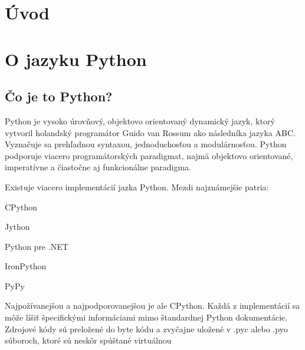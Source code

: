 \documentclass[11pt,oneside,final]{fithesis2}
\begin{document}
 \FrontMatter  
 \ThesisTitlePage

\begin{ThesisDeclaration}
\DeclarationText
\AdvisorName
\end{ThesisDeclaration}

\begin{ThesisThanks}
\end{ThesisThanks}

\begin{ThesisAbstract}
\end{ThesisAbstract}

\begin{ThesisKeyWords}
\end{ThesisKeyWords}



\MainMatter  
\tableofcontents

\chapter{Úvod}



\chapter{O jazyku Python}

	\section{Čo je to Python?}
	Python je vysoko úrovňový, objektovo orientovaný dynamický jazyk, ktorý vytvoril holandský programátor Guido van Rossum ako následníka jazyka ABC.
Vyznačuje sa prehľadnou syntaxou, jednoduchosťou a modulárnosťou. Python podporuje viacero programátorských paradigmat, najmä objektovo orientované, imperatívne a čiastočne aj funkcionálne paradigma.

Existuje viacero implementácií jazka Python. Mezdi najznámejšie patria:
\begin{list}{•}{}
\item CPython
\item Jython
\item Python pre .NET
\item IronPython
\item PyPy
\end{list}

Najpožívanejšou a najpodporovanejšou je ale CPython. Každá z implementácií sa môže líšiť špecifickými informáciami mimo štandardnej Python dokumentácie.
Zdrojové kódy sú preložené do byte kódu a zvyčajne uložené v .pyc alebo .pyo súboroch, ktoré sú neskôr spúštané virtuálnou
\end{document}
